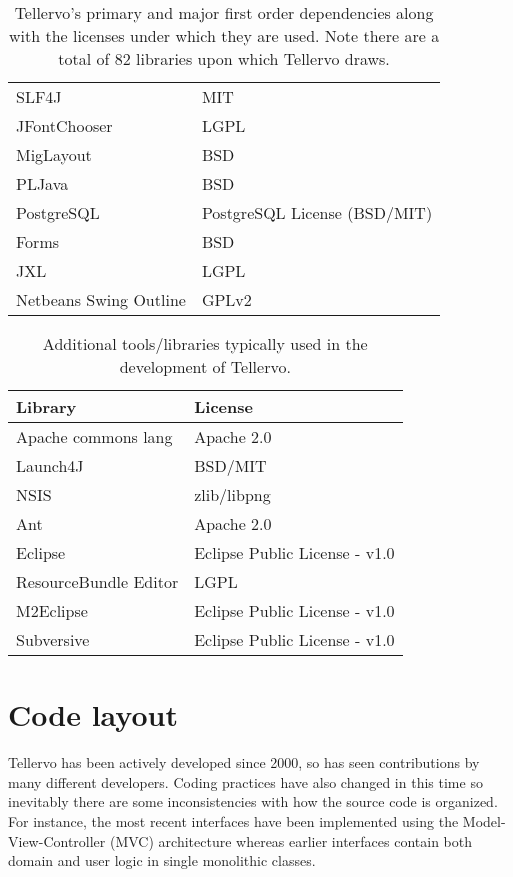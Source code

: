 \begin{table*}[htbp]
\begin{tabular*}{0.6\textwidth}{ll}
SLF4J & MIT\\
JFontChooser & LGPL\\
MigLayout & BSD\\
PLJava & BSD\\
PostgreSQL & PostgreSQL License (BSD/MIT)\\
Forms & BSD\\
JXL & LGPL\\
Netbeans Swing Outline & GPLv2\\
\bottomrule
\end{tabular*}
\captionsetup{width=0.6\textwidth}
\caption{Tellervo's primary and major first order dependencies along with the licenses under which they are used.  Note there are a total of 82 libraries upon which Tellervo draws.}
\label{tbl:desktopDependencies}
\end{table*}


\begin{table*}[htbp]
\centering
\label{tbl:developDependencies}
\begin{tabular*}{0.6\textwidth}{ll}
\toprule
Library & License \\
\midrule
Apache commons lang & Apache 2.0 \\
Launch4J & BSD/MIT \\
NSIS & zlib/libpng \\
Ant & Apache 2.0 \\
Eclipse & Eclipse Public License - v1.0\\
ResourceBundle Editor & LGPL \\
M2Eclipse & Eclipse Public License - v1.0\\
Subversive & Eclipse Public License - v1.0\\
\bottomrule
\end{tabular*}
\captionsetup{width=0.6\textwidth}
\caption{Additional tools/libraries typically used in the development of Tellervo.}
\end{table*}

\section{Code layout}
Tellervo has been actively developed since 2000, so has seen contributions by many different developers.  Coding practices have also changed in this time so inevitably there are some inconsistencies with how the source code is organized.  For instance, the most recent interfaces have been implemented using the Model-View-Controller (MVC) architecture whereas earlier interfaces contain both domain and user logic in single monolithic classes.  

